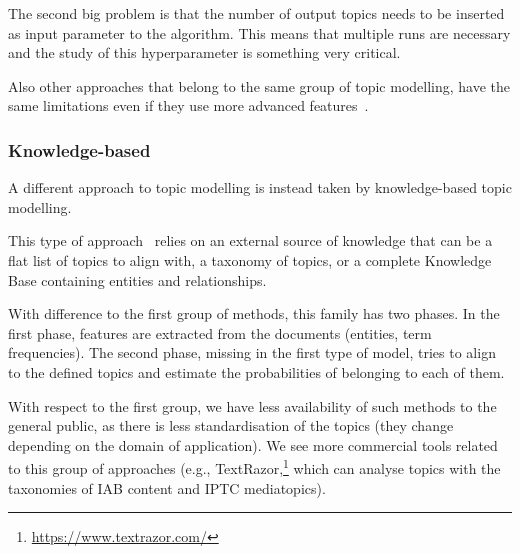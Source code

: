 
The second big problem is that the number of output topics needs to be inserted as input parameter to the algorithm. This means that multiple runs are necessary and the study of this hyperparameter is something very critical.

Also other approaches that belong to the same group of topic modelling, have the same limitations even if they use more advanced features~\citep{wang2012nonnegative,landauer1998introduction,grootendorst2022bertopic}.


\subsubsection{Knowledge-based}

A different approach to topic modelling is instead taken by knowledge-based topic modelling.

This type of approach~\citep{chen2013leveraging,allahyari2017knowledge,xu2018hierarchical,ali2019transportation} relies on an external source of knowledge that can be a flat list of topics to align with, a taxonomy of topics, or a complete Knowledge Base containing entities and relationships.

With difference to the first group of methods, this family has two phases.
In the first phase, features are extracted from the documents (entities, term frequencies).
The second phase, missing in the first type of model, tries to align to the defined topics and estimate the probabilities of belonging to each of them.

With respect to the first group, we have less availability of such methods to the general public, as there is less standardisation of the topics (they change depending on the domain of application).
We see more commercial tools related to this group of approaches (e.g., TextRazor,\footnote{\url{https://www.textrazor.com/}} which can analyse topics with the taxonomies of IAB content and IPTC mediatopics).




